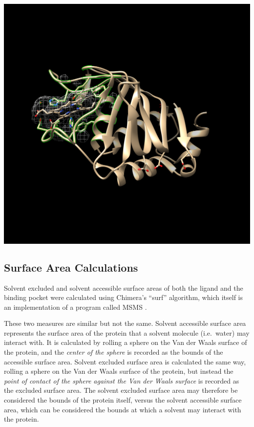 \documentclass[a4paper, nobind]{templates/ociamthesis}
\let\origfigure\figure
\let\endorigfigure\endfigure
\renewenvironment{figure}[1][2] {
    \expandafter\origfigure\expandafter[H]
} {
    \endorigfigure
}
\begin{document}
\begin{figure}

{\centering \includegraphics[width=0.7\linewidth]{figures/1DKH.bad} 

}

\caption{Non-Ideal Example of Surfnet Run (1DKH)}\label{fig:badExample}
\end{figure}

\hypertarget{SAmethods}{%
\subsection{Surface Area Calculations}\label{SAmethods}}

Solvent excluded and solvent accessible surface areas of both the ligand and the binding pocket were calculated using Chimera's ``surf'' algorithm, which itself is an implementation of a program called MSMS \autocite{Sanner1996}.

These two measures are similar but not the same. Solvent accessible surface area represents the surface area of the protein that a solvent molecule (i.e.~water) may interact with. It is calculated by rolling a sphere on the Van der Waals surface of the protein, and the \emph{center of the sphere} is recorded as the bounds of the accessible surface area. Solvent excluded surface area is calculated the same way, rolling a sphere on the Van der Waals surface of the protein, but instead the \emph{point of contact of the sphere against the Van der Waals surface} is recorded as the excluded surface area. The solvent excluded surface area may therefore be considered the bounds of the protein itself, versus the solvent accessible surface area, which can be considered the bounds at which a solvent may interact with the protein\autocite{Sanner1996}.
\end{document}
